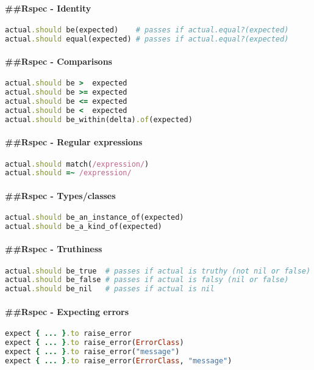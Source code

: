 \documentclass[serif,mathserif]{article}
\begin{document}
\paragraph{\#\#Rspec - Identity}
\begin{lstlisting}[language=ruby]
actual.should be(expected)    # passes if actual.equal?(expected)
actual.should equal(expected) # passes if actual.equal?(expected)
\end{lstlisting}

\paragraph{\#\#Rspec - Comparisons}
\begin{lstlisting}[language=ruby]
actual.should be >  expected
actual.should be >= expected
actual.should be <= expected
actual.should be <  expected
actual.should be_within(delta).of(expected)
\end{lstlisting}

\paragraph{\#\#Rspec - Regular expressions}
\begin{lstlisting}[language=ruby]
actual.should match(/expression/)
actual.should =~ /expression/
\end{lstlisting}

\paragraph{\#\#Rspec - Types/classes}
\begin{lstlisting}[language=ruby]
actual.should be_an_instance_of(expected)
actual.should be_a_kind_of(expected)
\end{lstlisting}


\paragraph{\#\#Rspec - Truthiness}
\begin{lstlisting}[language=ruby]
actual.should be_true  # passes if actual is truthy (not nil or false)
actual.should be_false # passes if actual is falsy (nil or false)
actual.should be_nil   # passes if actual is nil
\end{lstlisting}

\paragraph{\#\#Rspec - Expecting errors}
\begin{lstlisting}[language=ruby]
expect { ... }.to raise_error
expect { ... }.to raise_error(ErrorClass)
expect { ... }.to raise_error("message")
expect { ... }.to raise_error(ErrorClass, "message")
\end{lstlisting}
\end{document}
